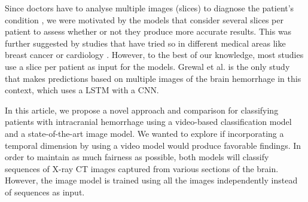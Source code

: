 Since doctors have to analyse multiple images (slices) to diagnose the patient's condition \cite{Thabarsa2023299}, we were motivated by the models that consider several slices per patient to assess whether or not they produce more accurate results. This was further suggested by studies that have tried so in different medical areas like breast cancer \cite{sarker2024mvswintmammogramclassificationmultiview, swint_multiview, hybrid_mammo_net} or cardiology \cite{JMAI5205}. However, to the best of our knowledge, most studies use a slice per patient as input for the models. Grewal et al. \cite{8363574} is the only study that makes predictions based on multiple images of the brain hemorrhage in this context, which uses a LSTM with a CNN.

In this article, we propose a novel approach and comparison for classifying patients with intracranial hemorrhage using a video-based classification model and a state-of-the-art image model. We wanted to explore if incorporating a temporal dimension by using a video model would produce favorable findings. In order to maintain as much fairness as possible, both models will classify sequences of X-ray CT images captured from various sections of the brain. However, the image model is trained using all the images independently instead of sequences as input.



